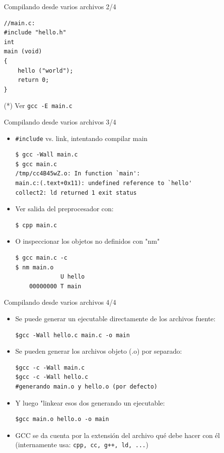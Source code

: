 \documentclass[xetex]{beamer}
\begin{document}
\begin{frame}[fragile]{Compilando desde varios archivos 2/4}
\begin{lstlisting}
//main.c:
#include "hello.h"
int
main (void)
{
    hello ("world");
    return 0;
}
\end{lstlisting}

(*) Ver \verb=gcc -E main.c=

\end{frame}

\begin{frame}[fragile]{Compilando desde varios archivos 3/4}
\begin{itemize}
  \item \verb=#include= vs. link, intentando compilar main
\begin{verbatim}
$ gcc -Wall main.c
$ gcc main.c
/tmp/cc4B45wZ.o: In function `main':
main.c:(.text+0x11): undefined reference to `hello'
collect2: ld returned 1 exit status 
\end{verbatim}
  \item Ver salida del preprocesador con:
\begin{verbatim}
$ cpp main.c
\end{verbatim}

  \item O inspeccionar los objetos no definidos con "nm"
\begin{verbatim}
$ gcc main.c -c
$ nm main.o
             U hello
    00000000 T main
\end{verbatim}
\end{itemize}
\end{frame}

\begin{frame}[fragile]{Compilando desde varios archivos 4/4}
\begin{itemize}
  \item Se puede generar un ejecutable directamente de los archivos fuente:
\begin{verbatim}
$gcc -Wall hello.c main.c -o main
\end{verbatim}
  \item Se pueden generar los archivos objeto (.o) por separado:
\begin{verbatim}
$gcc -c -Wall main.c
$gcc -c -Wall hello.c
#generando main.o y hello.o (por defecto)
\end{verbatim}
  \item Y luego "linkear esos dos generando un ejecutable:
\begin{verbatim}
$gcc main.o hello.o -o main
\end{verbatim}
  \item GCC se da cuenta por la extensión del archivo qué debe hacer con él
    (internamente usa: \verb=cpp, cc, g++, ld, ...=)
\end{itemize}
\end{frame}
\end{document}
